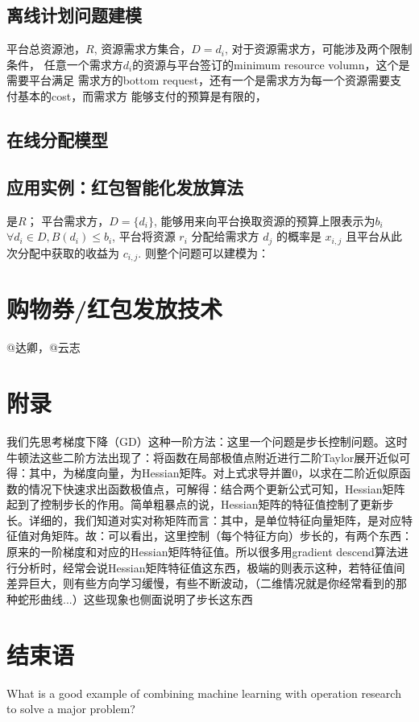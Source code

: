 \subsection{离线计划问题建模}

平台总资源池，$R$, 资源需求方集合，$D={d_i}$, 对于资源需求方，可能涉及两个限制条件，
任意一个需求方$d_i$的资源与平台签订的minimum resource volumn，这个是需要平台满足
需求方的bottom request，还有一个是需求方为每一个资源需要支付基本的cost，而需求方
能够支付的预算是有限的，

\subsection{在线分配模型}


\subsection{应用实例：红包智能化发放算法} 

是$R$；
平台需求方，$D=\{ d_i \}$, 能够用来向平台换取资源的预算上限表示为$b_i$ $\forall d_i \in D, B(d_i) \leq b_i$, 
平台将资源 $r_i$ 分配给需求方 $d_j$ 的概率是 $x_{i,j}$ 且平台从此次分配中获取的收益为 $c_{i,j}$. 
则整个问题可以建模为： 



\section{购物券/红包发放技术} 
	@达卿，@云志

\section{附录} 
我们先思考梯度下降（GD）这种一阶方法：这里一个问题是步长控制问题。这时牛顿法这些二阶方法出现了：将函数在局部极值点附近进行二阶Taylor展开近似可得：其中，为梯度向量，为Hessian矩阵。对上式求导并置0，以求在二阶近似原函数的情况下快速求出函数极值点，可解得：结合两个更新公式可知，Hessian矩阵起到了控制步长的作用。简单粗暴点的说，Hessian矩阵的特征值控制了更新步长。详细的，我们知道对实对称矩阵而言：其中，是单位特征向量矩阵，是对应特征值对角矩阵。故：可以看出，这里控制（每个特征方向）步长的，有两个东西：原来的一阶梯度和对应的Hessian矩阵特征值。所以很多用gradient descend算法进行分析时，经常会说Hessian矩阵特征值这东西，极端的则表示这种，若特征值间差异巨大，则有些方向学习缓慢，有些不断波动，（二维情况就是你经常看到的那种蛇形曲线...）这些现象也侧面说明了步长这东西


\section{结束语} 
What is a good example of combining machine learning with operation research to solve a major problem? 


